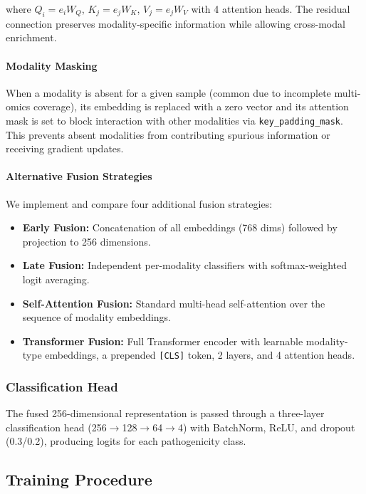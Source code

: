 \documentclass[journal,twoside]{IEEEtran}
\begin{document}
\noindent where $Q_i = e_i W_Q$, $K_j = e_j W_K$, $V_j = e_j W_V$ with
4 attention heads. The residual connection preserves modality-specific
information while allowing cross-modal enrichment.

\paragraph{Modality Masking}
When a modality is absent for a given sample (common due to incomplete
multi-omics coverage), its embedding is replaced with a zero vector and
its attention mask is set to block interaction with other modalities via
\texttt{key\_padding\_mask}. This prevents absent modalities from
contributing spurious information or receiving gradient updates.

\paragraph{Alternative Fusion Strategies}
We implement and compare four additional fusion strategies:
\begin{itemize}
    \item \textbf{Early Fusion:} Concatenation of all embeddings (768 dims)
    followed by projection to 256 dimensions.
    \item \textbf{Late Fusion:} Independent per-modality classifiers with
    softmax-weighted logit averaging.
    \item \textbf{Self-Attention Fusion:} Standard multi-head self-attention
    over the sequence of modality embeddings.
    \item \textbf{Transformer Fusion:} Full Transformer encoder with
    learnable modality-type embeddings, a prepended \texttt{[CLS]} token,
    2 layers, and 4 attention heads.
\end{itemize}

\subsubsection{Classification Head}
The fused 256-dimensional representation is passed through a three-layer
classification head (256$\to$128$\to$64$\to$4) with BatchNorm, ReLU, and
dropout (0.3/0.2), producing logits for each pathogenicity class.

\subsection{Training Procedure}
\end{document}
